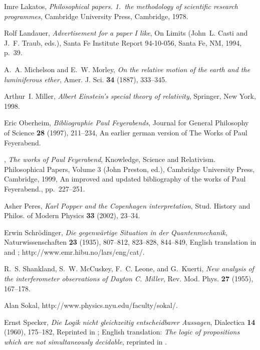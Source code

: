 \documentclass{article}
\begin{document}
\begin{thebibliography}{10}
Imre Lakatos, \emph{Philosophical papers. 1.~the methodology of scientific
  research programmes}, Cambridge University Press, Cambridge, 1978.

Rolf Landauer, \emph{Advertisement for a paper {I} like}, On Limits (John~L.
  Casti and J.~F. Traub, eds.), Santa Fe Institute Report 94-10-056, Santa Fe,
  NM, 1994, p.~39.

A.~A. Michelson and E.~W. Morley, \emph{On the relative motion of the earth and
  the luminiferous ether}, Amer. J. Sci. \textbf{34} (1887), 333--345.

Arthur~I. Miller, \emph{{A}lbert {E}instein's special theory of relativity},
  Springer, New York, 1998.

Eric Oberheim, \emph{Bibliographie {P}aul {F}eyerabends}, Journal for General
  Philosophy of Science \textbf{28} (1997), 211--234, An earlier german version
  of The Works of Paul Feyerabend.

\bysame, \emph{The works of {P}aul {F}eyerabend}, Knowledge, Science and
  Relativism. {P}hilosophical Papers, Volume 3 (John Preston, ed.), Cambridge
  University Press, Cambridge, 1999, An improved and updated bibliography of
  the works of Paul Feyerabend., pp.~227--251.

Asher Peres, \emph{{K}arl {P}opper and the {C}openhagen interpretation}, Stud.
  History and Philos. of Modern Physics \textbf{33} (2002), 23--34.

Erwin Schr{\"{o}}dinger, \emph{Die gegenw{\"{a}}rtige {S}ituation in der
  {Q}uantenmechanik}, Naturwissenschaften \textbf{23} (1935), 807--812,
  823--828, 844--849, {E}nglish translation in \cite{trimmer} and \cite[pp.
  152-167]{wheeler-Zurek:83}; http://www.emr.hibu.no/lars/eng/cat/.

R.~S. Shankland, S.~W. McCuskey, F.~C. Leone, and G.~Kuerti, \emph{New analysis
  of the interferometer observations of {D}ayton {C}. {M}iller}, Rev. Mod.
  Phys. \textbf{27} (1955), 167--178.

Alan Sokal, http://www.physics.nyu.edu/faculty/sokal/.

Ernst Specker, \emph{{D}ie {L}ogik nicht gleichzeitig entscheidbarer
  {A}ussagen}, Dialectica \textbf{14} (1960), 175--182, Reprinted in \cite[pp.
  175--182]{specker-ges}; {E}nglish translation: {\it The logic of propositions
  which are not simultaneously decidable}, reprinted in \cite[pp.
  135-140]{hooker}.


\end{thebibliography}
\end{document}
